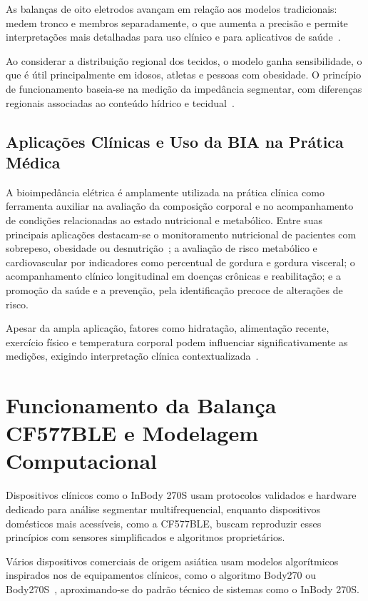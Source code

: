 As balanças de oito eletrodos avançam em relação aos modelos tradicionais: medem
tronco e membros separadamente, o que aumenta a precisão e permite interpretações mais
detalhadas para uso clínico e para aplicativos de saúde~\cite{manualsplus2025}.

Ao considerar a distribuição regional dos tecidos, o modelo ganha sensibilidade, o que
é útil principalmente em idosos, atletas e pessoas com obesidade. O princípio de
funcionamento baseia-se na medição da impedância segmentar, com diferenças regionais
associadas ao conteúdo hídrico e tecidual~\cite{lukaski1986}.

\subsection{Aplicações Clínicas e Uso da BIA na Prática Médica}

A bioimpedância elétrica é amplamente utilizada na prática clínica como ferramenta
auxiliar na avaliação da composição corporal e no acompanhamento de condições
relacionadas ao estado nutricional e metabólico. Entre suas principais aplicações
destacam-se o monitoramento nutricional de pacientes com sobrepeso, obesidade ou
desnutrição~\cite{espen2025}; a avaliação de risco metabólico e cardiovascular por
indicadores como percentual de gordura e gordura visceral; o acompanhamento clínico
longitudinal em doenças crônicas e reabilitação; e a promoção da saúde e a prevenção,
pela identificação precoce de alterações de risco.

Apesar da ampla aplicação, fatores como hidratação, alimentação recente, exercício
físico e temperatura corporal podem influenciar significativamente as medições,
exigindo interpretação clínica contextualizada~\cite{espen2025}.

\section{Funcionamento da Balança CF577BLE e Modelagem Computacional}

Dispositivos clínicos como o InBody 270S usam protocolos validados e hardware dedicado
para análise segmentar multifrequencial, enquanto dispositivos domésticos mais
acessíveis, como a CF577BLE, buscam reproduzir esses princípios com sensores
simplificados e algoritmos proprietários.

Vários dispositivos comerciais de origem asiática usam modelos algorítmicos inspirados
nos de equipamentos clínicos, como o algoritmo Body270 ou Body270S~\cite{besthealth2023},
aproximando-se do padrão técnico de sistemas como o InBody 270S.

